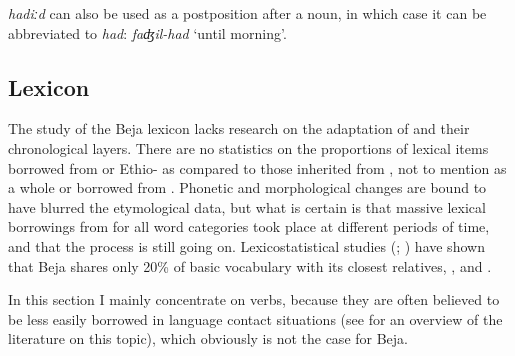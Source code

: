 \documentclass[output=paper]{langsci/langscibook}
\begin{document}
\textit{hadiːd} can also be used as a postposition after a noun, in which case it can be abbreviated to \textit{had}: \textit{faʤil-had} ‘until morning’.


 
 \subsection{Lexicon}


The study of the Beja lexicon lacks research on the adaptation of   and their chronological layers. There are no statistics on the proportions of lexical items borrowed from  or Ethio- as compared to those inherited from , not to mention  as a whole or borrowed from . Phonetic and morphological changes are bound to have blurred the etymological data, but what is certain is that massive lexical borrowings from  for all word categories took place at different periods of time, and that the process is still going on. Lexicostatistical studies (\citealt[267]{Cohen1988}; \citealt{Blažek1997}) have shown that Beja shares only 20\% of basic vocabulary with its closest relatives, ,  and .

In this section I mainly concentrate on verbs, because they are often believed to be less  easily borrowed in language contact situations (see \citealt{Wohlgemuth2009} for an overview of the literature on this topic), which obviously is not the case for Beja.
\end{document}
